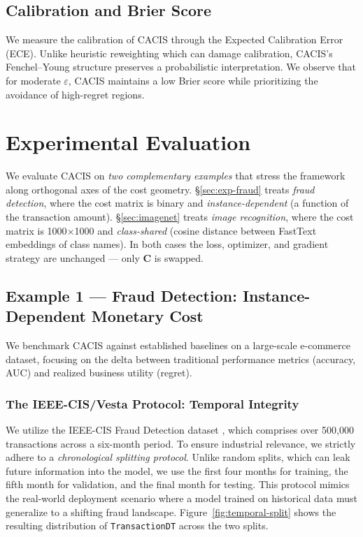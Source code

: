 \documentclass[sigconf,anonymous]{acmart}
\newcommand{\CACIS}{\textsc{CACIS}}
\newcommand{\mC}{\mathbf{C}}
\begin{document}

\subsection{Calibration and Brier Score}
We measure the calibration of \CACIS{} through the Expected Calibration Error (ECE). Unlike heuristic reweighting which can damage calibration, \CACIS's Fenchel--Young structure preserves a probabilistic interpretation. We observe that for moderate $\varepsilon$, \CACIS{} maintains a low Brier score while prioritizing the avoidance of high-regret regions.

\section{Experimental Evaluation}
\label{sec:experiments}
We evaluate \CACIS{} on \emph{two complementary examples} that stress the framework along orthogonal axes of the cost geometry. \S\ref{sec:exp-fraud} treats \emph{fraud detection}, where the cost matrix is binary and \emph{instance-dependent} (a function of the transaction amount). \S\ref{sec:imagenet} treats \emph{image recognition}, where the cost matrix is 1000$\times$1000 and \emph{class-shared} (cosine distance between FastText embeddings of class names). In both cases the loss, optimizer, and gradient strategy are unchanged --- only $\mC$ is swapped.

\subsection*{Example 1 --- Fraud Detection: Instance-Dependent Monetary Cost}
\label{sec:exp-fraud}
We benchmark \CACIS{} against established baselines on a large-scale e-commerce dataset, focusing on the delta between traditional performance metrics (accuracy, AUC) and realized business utility (regret).

\subsubsection{The IEEE-CIS/Vesta Protocol: Temporal Integrity}
We utilize the IEEE-CIS Fraud Detection dataset \citep{kaggle_ieee_cis_2019}, which comprises over 500,000 transactions across a six-month period. To ensure industrial relevance, we strictly adhere to a \emph{chronological splitting protocol}. Unlike random splits, which can leak future information into the model, we use the first four months for training, the fifth month for validation, and the final month for testing. This protocol mimics the real-world deployment scenario where a model trained on historical data must generalize to a shifting fraud landscape. Figure~\ref{fig:temporal-split} shows the resulting distribution of \texttt{TransactionDT} across the two splits.
\end{document}
